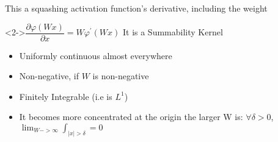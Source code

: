 \documentclass[dvipsnames,handout]{beamer}
\renewcommand{\v}{\varphi}
\newcommand{\vp}{\v^\prime}
\begin{document}
\begin{frame}{This a squashing activation function's derivative, including the weight}
	\begin{block}<2->{$\dfrac{\partial\v(Wx)}{\partial x}=W\vp(Wx)$ \hfill It is a Summability Kernel}
		\begin{itemize}
			\item Uniformly continuous almost everywhere
			\item Non-negative, if $W$ is non-negative
			\item Finitely Integrable (i.e is $L^1$)
			\item It becomes more concentrated at the origin the larger W is: $\forall \delta>0$, $\displaystyle\lim_{W->\infty} \int_{|x|>\delta} = 0$
		\end{itemize}
		
	\end{block}
	
	
	\begin{columns}[onlytextwidth]
		\begin{column}{0.33\textwidth}
			\centering
		\end{column}
		
		
		\begin{column}{0.33\textwidth}
			\centering
		\end{column}
		
		
		\begin{column}{0.33\textwidth}
			\centering
		\end{column}	
	\end{columns}	
\end{frame}
\end{document}
